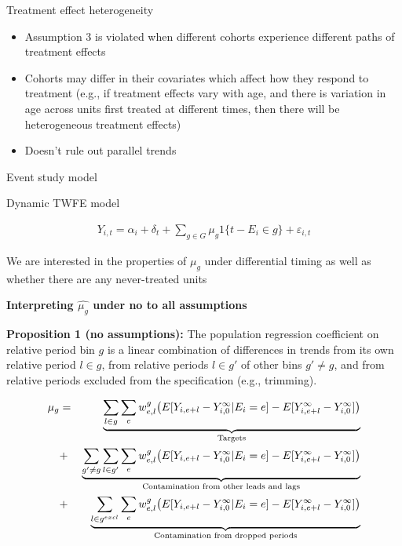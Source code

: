 \documentclass{beamer}
\begin{document}
\begin{frame}{Treatment effect heterogeneity}

\begin{itemize}
\item Assumption 3 is violated when different cohorts experience different paths of treatment effects
\item Cohorts may differ in their covariates which affect how they respond to treatment (e.g., if treatment effects vary with age, and there is variation in age across units first treated at different times, then there will be heterogeneous treatment effects)
\item Doesn't rule out parallel trends
\end{itemize}

\end{frame}

\begin{frame}{Event study model}

Dynamic TWFE model

\begin{eqnarray*}
Y_{i,t} = \alpha_i + \delta_t + \sum_{g \in G} \mu_g1\{t-E_i \in g \} + \varepsilon_{i,t}
\end{eqnarray*}

\bigskip

We are interested in the properties of $\mu_g$ under differential timing as well as whether there are any never-treated units

\end{frame}



\begin{frame}[plain, shrink=20]
\begin{center}
\textbf{Interpreting $\widehat{\mu_g}$ under no to all assumptions}
\end{center}

\textbf{Proposition 1 (no assumptions):} The population regression coefficient on relative period bin $g$ is a linear combination of differences in trends from its own relative period $l \in g$, from relative periods $l \in g'$ of other bins $g' \neq g$, and from relative periods excluded from the specification (e.g., trimming). 

\begin{eqnarray*}
\mu_g &=& \underbrace{\sum_{l \in g} \sum_{e} w^g_{e,l} \big ( E[Y_{i,e+l} - Y^{\infty}_{i,0} | E_i = e] - E[Y^{\infty}_{i,e+l} - Y^{\infty}_{i,0}] \big )}_{\mathclap{\text{Targets}}} \\
&+& \underbrace{\sum_{g' \neq g} \sum_{l \in g'} \sum_e w^g_{e,l} \big ( E[Y_{i,e+l} - Y^{\infty}_{i,0} | E_i=e] - E[Y^{\infty}_{i,e+l} - Y^{\infty}_{i,0}] \big )}_{\mathclap{\text{Contamination from other leads and lags}}} \\
&+&  \underbrace{\sum_{l \in g^{excl}} \sum_{e} w^g_{e,l} \big ( E[Y_{i,e+l} - Y^{\infty}_{i,0} | E_i=e] - E[Y^{\infty}_{i,e+l} - Y^{\infty}_{i,0}] \big )}_{\mathclap{\text{Contamination from dropped periods}}} 
\end{eqnarray*}

\bigskip


\end{frame}
\end{document}
